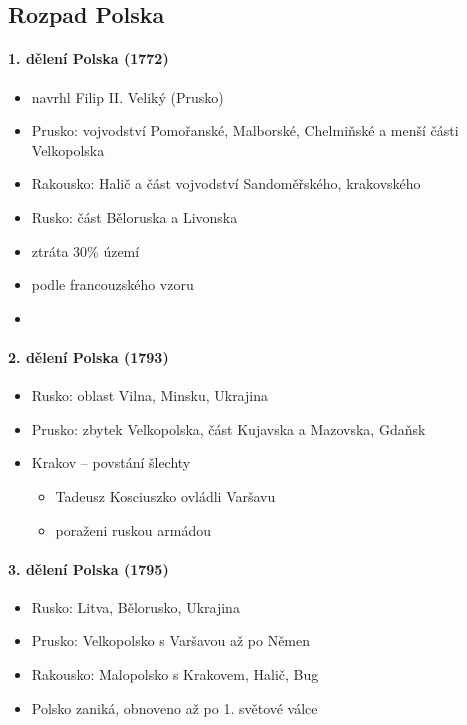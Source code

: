 \subsection{Rozpad Polska}
\paragraph{1. dělení Polska (1772)}
\begin{itemize}
\item navrhl Filip II. Veliký (Prusko)
\item Prusko: vojvodství Pomořanské, Malborské, Chelmiňské a menší části Velkopolska
\item Rakousko: Halič a část vojvodství Sandoměřského, krakovského
\item Rusko: část Běloruska a Livonska
\item ztráta 30\% území
\item {} podle francouzského vzoru
\item {}
\end{itemize}

\paragraph{2. dělení Polska (1793)}
\begin{itemize}
\item Rusko: oblast Vilna, Minsku, Ukrajina
\item Prusko: zbytek Velkopolska, část Kujavska a Mazovska, Gdaňsk
\item Krakov -- povstání šlechty 
	\begin{itemize}
	\item Tadeusz Kosciuszko ovládli Varšavu
	\item poraženi ruskou armádou
	\end{itemize}
\end{itemize}

\paragraph{3. dělení Polska (1795)}
\begin{itemize}
\item Rusko: Litva, Bělorusko, Ukrajina
\item Prusko: Velkopolsko s Varšavou až po Němen
\item Rakousko: Malopolsko s Krakovem, Halič, Bug
\item Polsko zaniká, obnoveno až po 1. světové válce 
\end{itemize}


